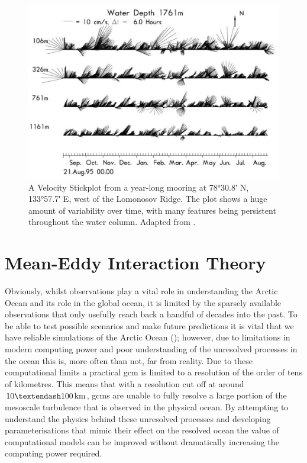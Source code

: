 \documentclass[10pt,a4paper]{report}
\begin{document}
\begin{figure}
	\centering
	\includegraphics[width=\linewidth]{Woodgate2001Mooring}
	\caption[Adapted from \cite{woodgate2001arctic}]{A Velocity Stickplot 
		from a year-long mooring at \ang{78;30.8;} N, \ang{133;57.7;} E, west of the Lomonosov Ridge.  The plot shows a huge amount of variability over time, with many
		features being persistent throughout the water column. Adapted from \cite{woodgate2001arctic}.}
	\label{fig:Woodgate2001Mooring}
\end{figure}

\section{Mean-Eddy Interaction Theory}

\label{meaneddyinteractiontheory}

 Obviously, whilst observations play a vital role in understanding the Arctic
 Ocean and its role in the global ocean, it is limited by the sparsely available
 observations that only usefully reach back a handful of decades into the past.
 To be able to test possible scenarios and make future predictions it is vital
 that we have reliable simulations of the Arctic Ocean (\cite{proshutinsky2008toward});
 however, due to limitations
 in modern computing power and poor understanding of the unresolved processes 
 in the ocean this is, more often than not, far from reality.
 Due to these computational limits a practical \gls{gcm} is 
 limited to a  resolution of the order of tens of kilometres. This means that with a 
 resolution  cut off at around $10 \textendash 100 \, \mathrm{km}$, 
 \glspl{gcm} are unable to fully resolve a large portion of the mesoscale turbulence that is
 observed in the physical ocean.
 By attempting  to understand the physics behind these unresolved processes 
 and developing parameterisations that mimic their effect on the resolved ocean
 the value of computational models can be improved without dramatically increasing the
 computing power required.  
 
\end{document}

